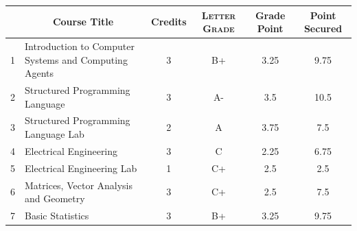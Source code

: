 \documentclass[11pt]{article}
\newcommand*{\numtwo}[1]{\pgfmathprintnumber[
                    fixed, precision=2, fixed zerofill=true]{#1}}
\begin{document}
                \begin{center}
                    \renewcommand{\arraystretch}{1.08}
                    
                \begin{tabular}{|c|l|c|>{\scshape}c|c|c|}
                \hline  \rule[-1ex]{0pt}{3.5ex} {\centering{\bf Course Code}} &  \multicolumn{1}{c|}{\textbf{Course Title}}  & {\bf Credits} & {\bf Letter Grade} & {\bf Grade Point} & {\bf Point Secured}  \\ 
                \hline   1 &  Introduction to Computer Systems and Computing Agents		 & 3 & B+ & 3.25 & 9.75 \\ %
                \hline   2 &  Structured Programming Language		 & 3 & A- & 3.5 & 10.5 \\ %
                \hline   3 &  Structured Programming Language Lab		 & 2 & A & 3.75 & 7.5 \\ %
                \hline   4 &  Electrical Engineering		 & 3 & C & 2.25 & 6.75 \\ %
                \hline   5 &  Electrical Engineering Lab		 & 1 & C+ & 2.5 & 2.5 \\ %
                \hline   6 &  Matrices, Vector Analysis and Geometry		 & 3 & C+ & 2.5 & 7.5 \\ %
                \hline   7 &  Basic Statistics		 & 3 & B+ & 3.25 & 9.75 \\ %

\hline                %
                \end{tabular}
                \end{center}
                \renewcommand{\arraystretch}{1.03}
\end{document}
